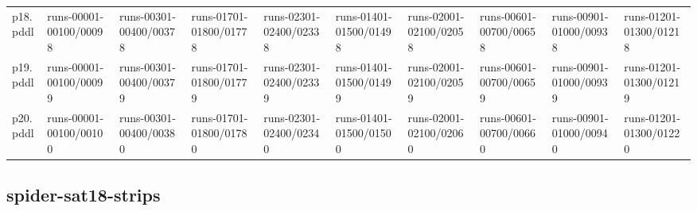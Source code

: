 \documentclass{article}
\begin{document}
\begin{tabular}{@{}lrrrrrrrrr@{}}
p18.pddl & \multicolumn{1}{|l|}{runs-00001-00100/00098} & \multicolumn{1}{|l|}{runs-00301-00400/00378} & \multicolumn{1}{|l|}{runs-01701-01800/01778} & \multicolumn{1}{|l|}{runs-02301-02400/02338} & \multicolumn{1}{|l|}{runs-01401-01500/01498} & \multicolumn{1}{|l|}{runs-02001-02100/02058} & \multicolumn{1}{|l|}{runs-00601-00700/00658} & \multicolumn{1}{|l|}{runs-00901-01000/00938} & \multicolumn{1}{|l|}{runs-01201-01300/01218} \\
p19.pddl & \multicolumn{1}{|l|}{runs-00001-00100/00099} & \multicolumn{1}{|l|}{runs-00301-00400/00379} & \multicolumn{1}{|l|}{runs-01701-01800/01779} & \multicolumn{1}{|l|}{runs-02301-02400/02339} & \multicolumn{1}{|l|}{runs-01401-01500/01499} & \multicolumn{1}{|l|}{runs-02001-02100/02059} & \multicolumn{1}{|l|}{runs-00601-00700/00659} & \multicolumn{1}{|l|}{runs-00901-01000/00939} & \multicolumn{1}{|l|}{runs-01201-01300/01219} \\
p20.pddl & \multicolumn{1}{|l|}{runs-00001-00100/00100} & \multicolumn{1}{|l|}{runs-00301-00400/00380} & \multicolumn{1}{|l|}{runs-01701-01800/01780} & \multicolumn{1}{|l|}{runs-02301-02400/02340} & \multicolumn{1}{|l|}{runs-01401-01500/01500} & \multicolumn{1}{|l|}{runs-02001-02100/02060} & \multicolumn{1}{|l|}{runs-00601-00700/00660} & \multicolumn{1}{|l|}{runs-00901-01000/00940} & \multicolumn{1}{|l|}{runs-01201-01300/01220} \\
\end{tabular}

\hypertarget{run_dir-spider-sat18-strips}{}
\subsection*{spider-sat18-strips}
\end{document}
